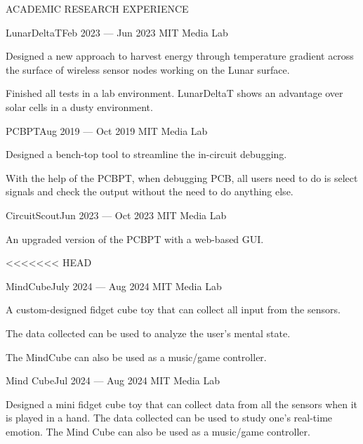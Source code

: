 \documentclass{resume} %
\begin{document}
\begin{rSection}{ACADEMIC RESEARCH EXPERIENCE}
\begin{rSubsection}{LunarDeltaT}{Feb 2023 --- Jun 2023}{ }{MIT Media Lab}
\item Designed a new approach to harvest energy through temperature gradient across
      the surface of wireless sensor nodes working on the Lunar surface.
\item Finished all tests in a lab environment.
      LunarDeltaT shows an advantage over solar cells in a dusty environment.
\end{rSubsection}

\begin{rSubsection}{PCBPT}{Aug 2019 --- Oct 2019}{ }{MIT Media Lab}
\item Designed a bench-top tool to streamline the in-circuit debugging.
\item With the help of the PCBPT, when debugging PCB, all users need to do is select signals and check the output without the need to do anything else.
\end{rSubsection}

\begin{rSubsection}{CircuitScout}{Jun 2023 --- Oct 2023}{ }{MIT Media Lab}
\item An upgraded version of the PCBPT with a web-based GUI.
\end{rSubsection}

<<<<<<< HEAD
\begin{rSubsection}{MindCube}{July 2024 --- Aug 2024}{ }{MIT Media Lab}
\item A custom-designed fidget cube toy that can collect all input from the sensors.
\item The data collected can be used to analyze the user's mental state.
\item The MindCube can also be used as a music/game controller.
\end{rSubsection}


\begin{rSubsection}{Mind Cube}{Jul 2024 --- Aug 2024}{ }{MIT Media Lab}
\item Designed a mini fidget cube toy that can collect data from all the sensors when it is
played in a hand. The data collected can be used to study one's real-time emotion.
The Mind Cube can also be used as a music/game controller.
\end{rSubsection}

\end{rSection}
\end{document}
